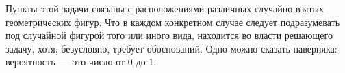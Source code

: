 ﻿\def\mb#1{\mathbb{#1}}
\newcommand{\ol}[1]{\overline{#1}}
\newcommand{\tbf}[1]{\textbf{#1}}

\newcommand\ccup{\mathop{\cup}}
\def\dist{\operatorname{dist}}
\newcommand{\id}{\operatorname{Id}}

\def\bar{\begin{array}}
\def\ear{\end{array}}
\newcommand{\Vol}{\operatorname{Vol}}


Пункты этой задачи связаны с расположениями различных случайно взятых геометрических фигур. Что в каждом конкретном случае следует подразумевать под случайной фигурой того или иного вида, находится во власти решающего задачу, хотя, безусловно, требует обоснований. Одно можно сказать наверняка: вероятность~— это число от 0 до 1.
